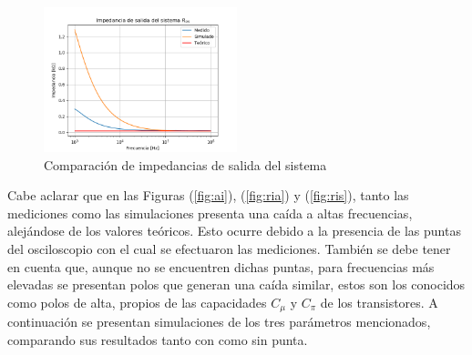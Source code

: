 \begin{figure}[H]
\centering
	\includegraphics[width=0.5\textwidth]{Imagenes/Ros.png}
	\caption{Comparación de impedancias de salida del sistema}
	\label{fig:ro}
\end{figure}

Cabe aclarar que en las Figuras (\ref{fig:ai}), (\ref{fig:ria}) y (\ref{fig:ris}), tanto las mediciones como las simulaciones presenta una caída a altas frecuencias, alejándose de los valores teóricos. Esto ocurre debido a la presencia de las puntas del osciloscopio con el cual se efectuaron las mediciones. También se debe tener en cuenta que, aunque no se encuentren dichas puntas, para frecuencias más elevadas se presentan polos que generan una caída similar, estos son los conocidos como polos de alta, propios de las capacidades $C_{\mu}$ y $C_{\pi}$ de los transistores. A continuación se presentan simulaciones de los tres parámetros mencionados, comparando sus resultados tanto con como sin punta.

